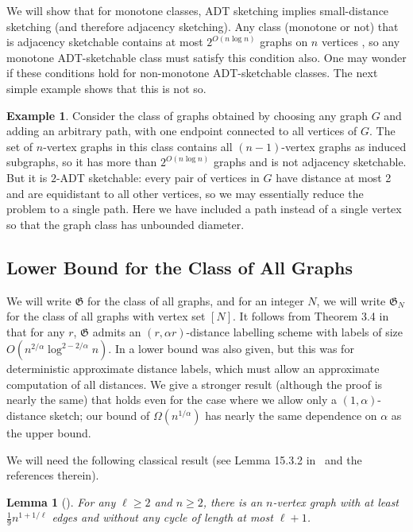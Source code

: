 \documentclass[11pt]{article}
\newtheorem{lemma}[thm]{Lemma}
\theoremstyle{definition}
\newtheorem{example}[thm]{Example}
\renewcommand{\ge}{\geqslant}
\def\fG{{\mathfrak G}}
\begin{document}
\noindent
We will show that for monotone classes, ADT sketching implies small-distance
sketching (and therefore adjacency sketching). Any class (monotone or not) that is adjacency
sketchable contains at most $2^{O(n \log n)}$ graphs on $n$ vertices \cite{KNR92,HWZ21}, so any
monotone ADT-sketchable class must satisfy this condition also. One may
wonder if these conditions hold for non-monotone ADT-sketchable classes. The next simple example
shows that this is not so.
\begin{example}
\label{example:general adt}
Consider the class of graphs obtained by choosing any graph $G$ and adding an arbitrary path, with
one endpoint connected to all vertices of $G$. The set of $n$-vertex graphs in this class contains
all $(n-1)$-vertex graphs as induced subgraphs, so it has more than $2^{O(n \log n)}$ graphs and is
not adjacency sketchable. But it is $2$-ADT sketchable: every pair of vertices in $G$ have distance
at most 2 and are equidistant to all other vertices, so we may essentially reduce the problem to a
single path.  Here we have included a path instead of a single vertex so that the graph class has
unbounded diameter.
\end{example}

\subsection{Lower Bound for the Class of All Graphs}

We will write $\fG$ for the class of all graphs, and for an integer
$N$, we will write $\fG_N$ for the class of
all graphs with vertex set $[N]$. It follows from Theorem 3.4 in \cite{TZ05} that
for any $r$,  $\fG$ admits an $(r,\alpha r)$-distance labelling scheme with labels of size
$O(n^{2/\alpha}\log^{2-2/\alpha} n)$.  In \cite{TZ05} a lower bound was also given, but this was for
deterministic approximate distance labels, which must allow an approximate computation of all
distances. We give a stronger result (although the proof is nearly the same) that holds even for the
case where we allow only a $(1,\alpha)$-distance sketch; our bound of $\Omega(n^{1/\alpha})$ has
nearly the same dependence on $\alpha$ as the upper bound.

We will need the following classical result (see Lemma 15.3.2 in~\cite{Mat13} and the references
therein).

\begin{lemma}[\cite{Mat13}]\label{lem:matou}
For any $\ell\ge 2$ and $n\ge 2$, there is an $n$-vertex graph with at
least $\tfrac19 n^{1+1/{\ell}}$ edges and without any cycle of
length at most $\ell+1$. 
\end{lemma}
\end{document}
